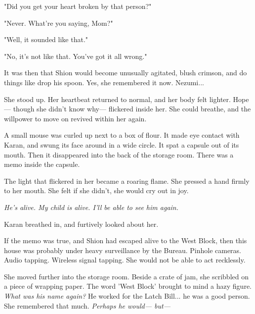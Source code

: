 "Did you get your heart broken by that person?"

"Never. What're you saying, Mom?"

"Well, it sounded like that."

"No, it's not like that. You've got it all wrong."

It was then that Shion would become unusually agitated, blush crimson,
and do things like drop his spoon. Yes, she remembered it now. Nezumi...

She stood up. Her heartbeat returned to normal, and her body felt
lighter. Hope--- though she didn't know why--- flickered inside her. She
could breathe, and the willpower to move on revived within her again.

A small mouse was curled up next to a box of flour. It made eye contact
with Karan, and swung its face around in a wide circle. It spat a
capsule out of its mouth. Then it disappeared into the back of the
storage room. There was a memo inside the capsule.


The light that flickered in her became a roaring flame. She pressed a
hand firmly to her mouth. She felt if she didn't, she would cry out in
joy.

\emph{He's alive. My child is alive. I'll be able to see him again.}

Karan breathed in, and furtively looked about her.

If the memo was true, and Shion had escaped alive to the West Block,
then this house was probably under heavy surveillance by the Bureau.
Pinhole cameras. Audio tapping. Wireless signal tapping. She would not
be able to act recklessly.

She moved further into the storage room. Beside a crate of jam, she
scribbled on a piece of wrapping paper. The word 'West Block' brought to
mind a hazy figure. \emph{What was his name again?} He worked for the Latch
Bill... he was a good person. She remembered that much. \emph{Perhaps he
would--- but---}

